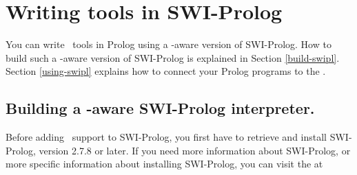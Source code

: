 
\section{\label{ToolsInSwipl}Writing tools in SWI-Prolog}

You can write \TB\ tools in Prolog using a \TB -aware version of
SWI-Prolog.
How to build such a \TB -aware version of SWI-Prolog is explained in
Section \ref{build-swipl}. Section \ref{using-swipl} explains how
to connect your Prolog programs to the \TB.

\subsection{\label{build-swipl}Building a \TB -aware SWI-Prolog interpreter.}

Before adding \TB\ support to SWI-Prolog, you first have to retrieve and
install SWI-Prolog, version 2.7.8 or later.
If you need more information about SWI-Prolog, or more
specific information about installing SWI-Prolog, you can visit the
 at 

